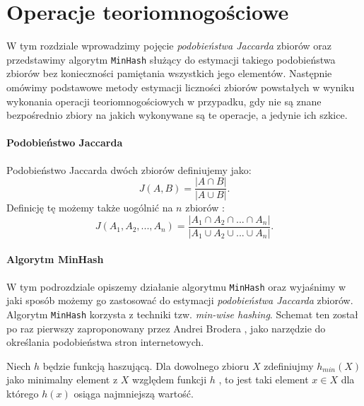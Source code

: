 \chapter{Operacje teoriomnogościowe}
\thispagestyle{chapterBeginStyle}

W tym rozdziale wprowadzimy pojęcie \textit{podobieństwa Jaccarda} zbiorów oraz przedstawimy algorytm \texttt{MinHash} służący do estymacji takiego podobieństwa zbiorów bez konieczności pamiętania wszystkich jego elementów.
 Następnie omówimy podstawowe metody estymacji liczności zbiorów powstałych w wyniku wykonania operacji teoriomnogościowych w przypadku, gdy nie są znane bezpośrednio zbiory na jakich wykonywane są te operacje, a jedynie ich szkice. 

\subsubsection{Podobieństwo Jaccarda}
Podobieństwo Jaccarda dwóch zbiorów definiujemy jako:
\begin{equation}
    J(A, B) = \frac{|A \cap B|}{|A \cup B|}.
\end{equation}
Definicję tę możemy także uogólnić  na $n$ zbiorów \cite{adroll}:
\begin{equation}
    J(A_1, A_2, ..., A_n) = \frac{|A_1 \cap A_2 \cap ... \cap A_n|}{|A_1 \cup A_2 \cup ... \cup A_n|}.
    \label{jacc_multi}
\end{equation}

\subsubsection{Algorytm MinHash}
\label{minhash}
W tym podrozdziale opiszemy działanie algorytmu \texttt{MinHash} oraz wyjaśnimy w jaki sposób możemy go zastosować do estymacji \textit{podobieństwa Jaccarda} zbiorów.
Algorytm \texttt{MinHash} korzysta z techniki tzw. \textit{min-wise hashing}. Schemat ten został po raz pierwszy zaproponowany przez Andrei Brodera \cite{broder}, jako narzędzie do określania podobieństwa stron internetowych.

Niech $h$ będzie funkcją haszującą.
 Dla dowolnego zbioru $X$ zdefiniujmy $h_{min}(X)$ jako minimalny element z $X$ względem funkcji $h$ , to jest taki element $x \in X$ dla którego $h(x)$ osiąga najmniejszą wartość.

